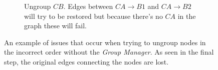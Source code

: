 \begin{figure}[h]
  \begin{subfigure}[t]{0.5\textwidth}
    \centering
    \caption{Ungroup $CB$. Edges between $CA\rightarrow B1$ and $CA\rightarrow B2$ will try to be restored but because there's no $CA$ in the graph these will fail.}
  \end{subfigure}
  \caption{An example of issues that occur when trying to ungroup nodes in the incorrect order without the \textit{Group Manager}. As seen in the final step, the original edges connecting the nodes are lost.}
\label{fig:clustring-without-groupmanager}
\end{figure}


